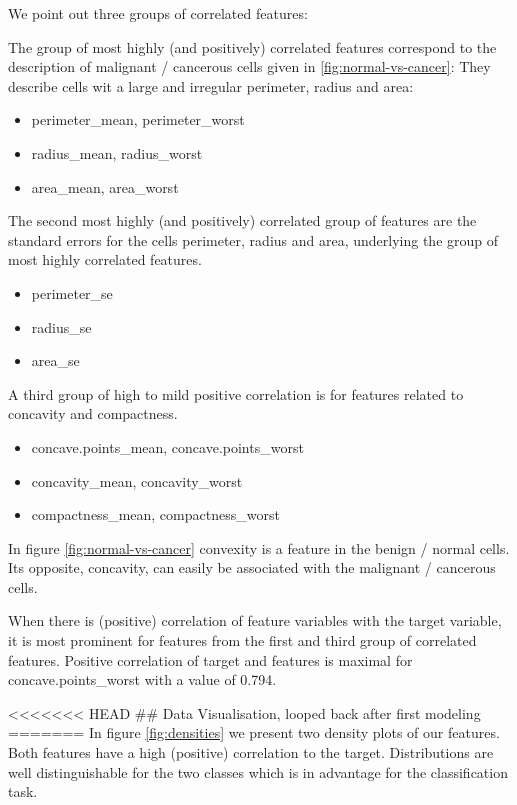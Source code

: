 \documentclass[]{article}
\providecommand{\tightlist}{%
  \setlength{\itemsep}{0pt}\setlength{\parskip}{0pt}}
\begin{document}
We point out three groups of correlated features:

The group of most highly (and positively) correlated features correspond
to the description of malignant / cancerous cells given in
\ref{fig:normal-vs-cancer}: They describe cells wit a large and
irregular perimeter, radius and area:

\begin{itemize}
\tightlist
\item
  perimeter\_mean, perimeter\_worst
\item
  radius\_mean, radius\_worst
\item
  area\_mean, area\_worst
\end{itemize}

The second most highly (and positively) correlated group of features are
the standard errors for the cells perimeter, radius and area, underlying
the group of most highly correlated features.

\begin{itemize}
\tightlist
\item
  perimeter\_se
\item
  radius\_se
\item
  area\_se
\end{itemize}

A third group of high to mild positive correlation is for features
related to concavity and compactness.

\begin{itemize}
\tightlist
\item
  concave.points\_mean, concave.points\_worst
\item
  concavity\_mean, concavity\_worst
\item
  compactness\_mean, compactness\_worst
\end{itemize}

In figure \ref{fig:normal-vs-cancer} convexity is a feature in the
benign / normal cells. Its opposite, concavity, can easily be associated
with the malignant / cancerous cells.

When there is (positive) correlation of feature variables with the
target variable, it is most prominent for features from the first and
third group of correlated features. Positive correlation of target and
features is maximal for concave.points\_worst with a value of 0.794.

\textless{}\textless{}\textless{}\textless{}\textless{}\textless{}\textless{}
HEAD \#\# Data Visualisation, looped back after first modeling =======
In figure \ref{fig:densities} we present two density plots of our
features. Both features have a high (positive) correlation to the
target. Distributions are well distinguishable for the two classes which
is in advantage for the classification task.
\end{document}
